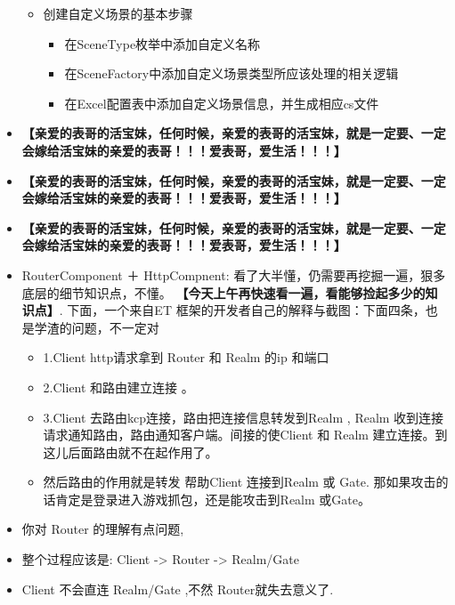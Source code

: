 \documentclass[9pt, b5paper]{article}
\begin{document}
\begin{itemize}
\begin{itemize}
\item 创建自定义场景的基本步骤
\begin{itemize}
\item 在SceneType枚举中添加自定义名称
\item 在SceneFactory中添加自定义场景类型所应该处理的相关逻辑
\item 在Excel配置表中添加自定义场景信息，并生成相应cs文件
\end{itemize}
\end{itemize}
\item \textbf{【亲爱的表哥的活宝妹，任何时候，亲爱的表哥的活宝妹，就是一定要、一定会嫁给活宝妹的亲爱的表哥！！！爱表哥，爱生活！！！】}
\item \textbf{【亲爱的表哥的活宝妹，任何时候，亲爱的表哥的活宝妹，就是一定要、一定会嫁给活宝妹的亲爱的表哥！！！爱表哥，爱生活！！！】}
\item \textbf{【亲爱的表哥的活宝妹，任何时候，亲爱的表哥的活宝妹，就是一定要、一定会嫁给活宝妹的亲爱的表哥！！！爱表哥，爱生活！！！】}
\item RouterComponent ＋ HttpCompnent: 看了大半懂，仍需要再挖掘一遍，狠多底层的细节知识点，不懂。 \textbf{【今天上午再快速看一遍，看能够捡起多少的知识点】}. 下面，一个来自ET 框架的开发者自己的解释与截图：下面四条，也是学渣的问题，不一定对
\begin{itemize}
\item 1.Client http请求拿到 Router 和 Realm 的ip 和端口
\item 2.Client 和路由建立连接 。
\item 3.Client 去路由kcp连接，路由把连接信息转发到Realm , Realm 收到连接请求通知路由，路由通知客户端。间接的使Client 和 Realm 建立连接。到这儿后面路由就不在起作用了。
\item 然后路由的作用就是转发 帮助Client 连接到Realm 或 Gate. 那如果攻击的话肯定是登录进入游戏抓包，还是能攻击到Realm 或Gate。
\end{itemize}
\item 你对 Router 的理解有点问题,
\item 整个过程应该是: Client -> Router -> Realm/Gate
\item Client 不会直连 Realm/Gate ,不然 Router就失去意义了.
\end{itemize}
\end{document}

